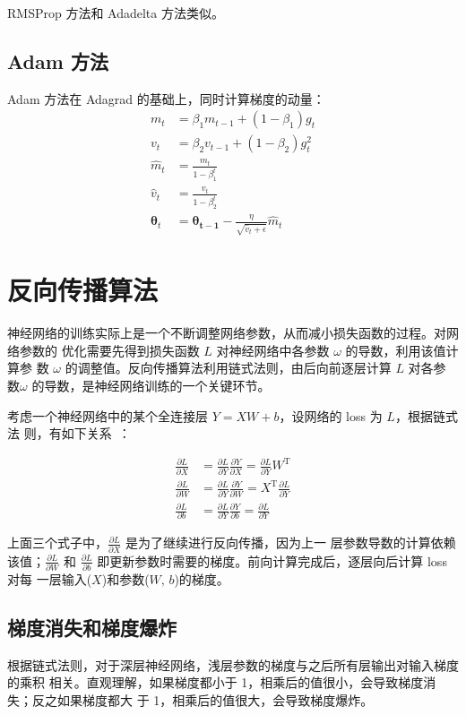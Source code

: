 RMSProp 方法和 Adadelta 方法类似。

\subsection{Adam 方法}
Adam 方法在 Adagrad 的基础上，同时计算梯度的动量：
\begin{align}
  m_t & = \beta_1 m_{t-1} + (1-\beta_1) g_t \\
  v_t & = \beta_2 v_{t-1} + (1-\beta_2) g_t^2 \\
  \hat{m}_t & = \frac{m_t}{1-\beta_1^t} \\
  \hat{v}_t & = \frac{v_t}{1-\beta_2^t} \\
  \boldsymbol{\theta}_{t} & = \boldsymbol{\theta_{t-1}} - \frac{\eta}{\sqrt{\hat{v}_t + \epsilon}}\hat{m}_t
\end{align}

\section{反向传播算法}
神经网络的训练实际上是一个不断调整网络参数，从而减小损失函数的过程。对网络参数的
优化需要先得到损失函数 $L$ 对神经网络中各参数 $\omega$ 的导数，利用该值计算参
数 $\omega$ 的调整值。反向传播算法利用链式法则，由后向前逐层计算 $L$ 对各参
数$\omega$ 的导数，是神经网络训练的一个关键环节。

考虑一个神经网络中的某个全连接层 $Y = XW + b$，设网络的 loss 为 $L$，根据链式法
则，有如下关系~：

\begin{align}
  \label{equ:bp-fc}
  \frac{\partial L}{\partial X} & = \frac{\partial L}{\partial Y} \frac{\partial Y}{\partial X} = \frac{\partial L}{\partial Y} W^{\mathrm{T}} \\
  \frac{\partial L}{\partial W} & = \frac{\partial L}{\partial Y} \frac{\partial Y}{\partial W} = X^{\mathrm{T}} \frac{\partial L}{\partial Y}\\
  \frac{\partial L}{\partial b} & = \frac{\partial L}{\partial Y} \frac{\partial Y}{\partial b} = \frac{\partial L}{\partial Y}
\end{align}

上面三个式子中，$\frac{\partial L}{\partial X}$ 是为了继续进行反向传播，因为上一
层参数导数的计算依赖该值；$\frac{\partial L}{\partial W}$ 和 $\frac{\partial
  L}{\partial b}$ 即更新参数时需要的梯度。前向计算完成后，逐层向后计算 loss 对每
一层输入($X$)和参数($W, \, b$)的梯度。

\subsection{梯度消失和梯度爆炸}
\label{subsec:gradient-vanish-explosion}
根据链式法则，对于深层神经网络，浅层参数的梯度与之后所有层输出对输入梯度的乘积
相关。直观理解，如果梯度都小于 1，相乘后的值很小，会导致梯度消失；反之如果梯度都大
于 1，相乘后的值很大，会导致梯度爆炸。

